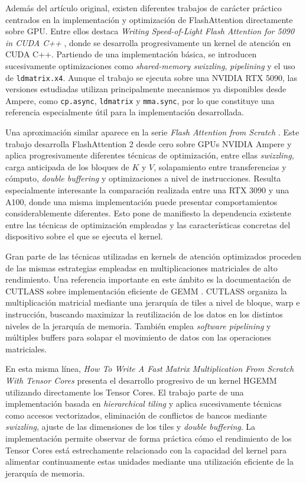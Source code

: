 Además del artículo original, existen diferentes trabajos de carácter práctico centrados en la implementación y optimización de FlashAttention directamente sobre GPU. Entre ellos destaca \textit{Writing Speed-of-Light Flash Attention for 5090 in CUDA C++} \cite{gaunernstFlashAttention}, donde se desarrolla progresivamente un kernel de atención en CUDA C++. Partiendo de una implementación básica, se introducen sucesivamente optimizaciones como \textit{shared-memory swizzling}, \textit{pipelining} y el uso de \texttt{ldmatrix.x4}. Aunque el trabajo se ejecuta sobre una NVIDIA RTX 5090, las versiones estudiadas utilizan principalmente mecanismos ya disponibles desde Ampere, como \texttt{cp.async}, \texttt{ldmatrix} y \texttt{mma.sync}, por lo que constituye una referencia especialmente útil para la implementación desarrollada.

Una aproximación similar aparece en la serie \textit{Flash Attention from Scratch} \cite{lubitschFlash}. Este trabajo desarrolla FlashAttention 2 desde cero sobre GPUs NVIDIA Ampere y aplica progresivamente diferentes técnicas de optimización, entre ellas \textit{swizzling}, carga anticipada de los bloques de \(K\) y \(V\), solapamiento entre transferencias y cómputo, \textit{double buffering} y optimizaciones a nivel de instrucciones. Resulta especialmente interesante la comparación realizada entre una RTX 3090 y una A100, donde una misma implementación puede presentar comportamientos considerablemente diferentes. Esto pone de manifiesto la dependencia existente entre las técnicas de optimización empleadas y las características concretas del dispositivo sobre el que se ejecuta el kernel.

Gran parte de las técnicas utilizadas en kernels de atención optimizados proceden de las mismas estrategias empleadas en multiplicaciones matriciales de alto rendimiento. Una referencia importante en este ámbito es la documentación de CUTLASS sobre implementación eficiente de GEMM \cite{cutlassEfficientGemm}. CUTLASS organiza la multiplicación matricial mediante una jerarquía de tiles a nivel de bloque, warp e instrucción, buscando maximizar la reutilización de los datos en los distintos niveles de la jerarquía de memoria. También emplea \textit{software pipelining} y múltiples buffers para solapar el movimiento de datos con las operaciones matriciales.

En esta misma línea, \textit{How To Write A Fast Matrix Multiplication From Scratch With Tensor Cores} \cite{armbrusterTensorCores} presenta el desarrollo progresivo de un kernel HGEMM utilizando directamente los Tensor Cores. El trabajo parte de una implementación basada en \textit{hierarchical tiling} y aplica sucesivamente técnicas como accesos vectorizados, eliminación de conflictos de bancos mediante \textit{swizzling}, ajuste de las dimensiones de los tiles y \textit{double buffering}. La implementación permite observar de forma práctica cómo el rendimiento de los Tensor Cores está estrechamente relacionado con la capacidad del kernel para alimentar continuamente estas unidades mediante una utilización eficiente de la jerarquía de memoria.

